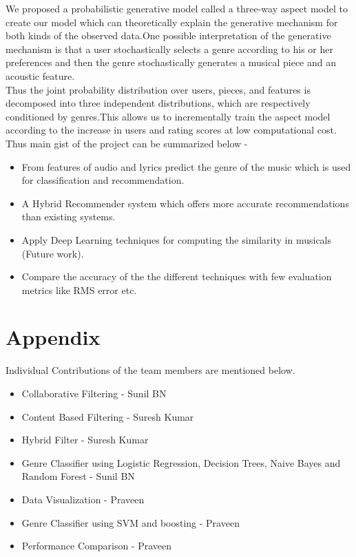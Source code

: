 \documentclass{sig-alternate-05-2015}
\begin{document}
We proposed a probabilistic generative model called a three-way aspect model to create our model which can theoretically explain the generative mechanism for both kinds of the observed data.One possible interpretation of the generative mechanism is that a user stochastically selects a genre according to his or her preferences and then the genre stochastically generates a musical piece and an acoustic feature.\\

Thus the joint probability distribution over users, pieces, and features is decomposed into three independent distributions, which are respectively conditioned by genres.This allows us to incrementally train the aspect model according to the increase in users and rating scores at low computational cost.\\

Thus main gist of the project can be summarized below -\\

\begin{itemize}
    \item From features of audio and lyrics predict the genre of the music which is used for classification and recommendation.
    \item A Hybrid Recommender system which offers more accurate recommendations than existing systems.
    \item Apply Deep Learning techniques for computing the similarity in musicals (Future work).
    \item Compare the accuracy of the the different techniques with few evaluation metrics like RMS error etc.
\end{itemize}

\section{Appendix}
Individual Contributions of the team members are mentioned below.
\begin{itemize}
    \item Collaborative Filtering - Sunil BN
    \item Content Based Filtering - Suresh Kumar
    \item Hybrid Filter - Suresh Kumar
    \item Genre Classifier using Logistic Regression, Decision Trees, Naive Bayes and Random Forest - Sunil BN
    \item Data Visualization - Praveen
    \item Genre Classifier using SVM and boosting - Praveen
    \item Performance Comparison - Praveen
    
\end{itemize}
\end{document}
